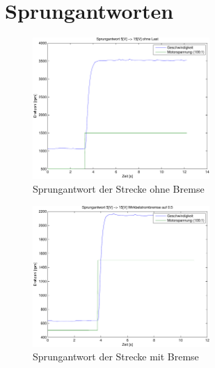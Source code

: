 \section{Sprungantworten}
\begin{figure}[h!]
    \centering
    \includegraphics[width=0.6\textwidth]{06/step_plot_noload.pdf}
    \caption{Sprungantwort der Strecke ohne Bremse}
    \label{fig:06a}
\end{figure}
\begin{figure}[h!]
    \centering
    \includegraphics[width=0.6\textwidth]{06/step_plot_load.pdf}
    \caption{Sprungantwort der Strecke mit Bremse}
    \label{fig:06b}
\end{figure}
